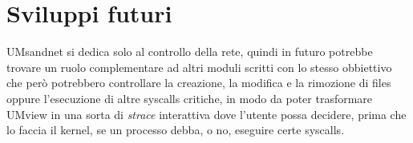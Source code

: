 \section{Sviluppi futuri}
UMsandnet si dedica solo al controllo della rete, quindi in futuro potrebbe trovare un ruolo complementare ad altri moduli scritti con lo stesso obbiettivo che però potrebbero controllare la creazione, la modifica e la rimozione di files oppure l'esecuzione di altre syscalls critiche, in modo da poter trasformare UMview in una sorta di {\em strace} interattiva dove l'utente possa decidere, prima che lo faccia il kernel, se un processo debba, o no, eseguire certe syscalls.